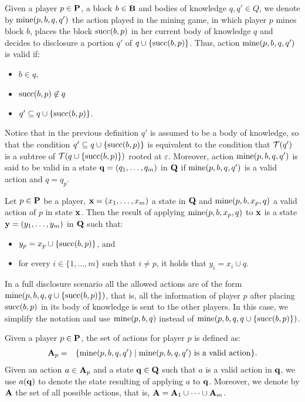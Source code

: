 \documentclass{article}
\begin{document}
Given a player $p \in \mathbf{P}$, a block $b \in \mathbf{B}$ and bodies of knowledge $q, q' \in Q$, we denote by $\text{mine}(p,b,q,q')$ the action played in the mining game, in which player $p$ mines block $b$, places the block $\text{succ}(b,p)$ in her current body of knowledge $q$ and decides to disclosure a portion $q'$ of $q \cup \{\text{succ}(b,p)\}$. Thus, action $\text{mine}(p,b,q,q')$ is valid if:
\begin{itemize}

\item $b \in q$,


\item $\text{succ}(b,p) \not\in q$

\item $q' \subseteq q \cup \{\text{succ}(b,p)\}$.
\end{itemize}
Notice that in the previous definition $q'$ is assumed to be a body of knowledge, so that the condition $q' \subseteq q \cup \{\text{succ}(b,p)\}$ is equivalent to the condition that $\mathcal{T}(q')$ is a subtree of $\mathcal{T}(q \cup \{\text{succ}(b,p)\})$ rooted at $\varepsilon$. Moreover, action $\text{mine}(p,b,q,q')$ is said to be valid in a state $\mathbf{q} = (q_1, \ldots, q_m)$ in $\mathbf{Q}$ if $\text{mine}(p,b,q,q')$ is a valid action and $q = q_p$.

Let $p \in \mathbf{P}$ be a player, $\mathbf{x} =  (x_1, \ldots, x_m)$ a state in $\mathbf{Q}$ and $\text{mine}(p,b,x_p,q)$ a valid action of $p$ in state $\mathbf{x}$. Then the result of applying $\text{mine}(p,b,x_p,q)$ to $\mathbf{x}$ is a state $\mathbf{y} = (y_1, \ldots, y_m)$ in $\mathbf{Q}$ such that:
\begin{itemize}
\item $y_p = x_p \cup \{\text{succ}(b,p)\}$, and

\item for every $i \in \{1, \ldots, m\}$ such that $i \neq p$, it holds that $y_i = x_i \cup q$.
\end{itemize}
In a full disclosure scenario all the allowed actions are of the form $\text{mine}(p,b,q,q \cup \{\text{succ}(b,p)\})$, that is, all the information of player $p$ after placing $\text{succ}(b,p)$ in its body of knowledge is sent to the other players. In this case, we simplify the notation and use $\text{mine}(p,b,q)$ instead of $\text{mine}(p,b,q,q\cup \{\text{succ}(b,p)\})$.

Given a player $p \in \mathbf{P}$, the set of actions for player $p$ is defined as:
\begin{eqnarray*}
\mathbf{A}_p & = & \{ \text{mine}(p,b,q,q') \mid \text{mine}(p,b,q,q') \text{ is a valid action}\}.
\end{eqnarray*}
Given an action $a \in \mathbf{A}_p$ and a state $\mathbf{q} \in \mathbf{Q}$ such that $a$ is a valid action in $\mathbf{q}$, we use $a(\mathbf{q})$ to denote the state resulting of applying $a$ to $\mathbf{q}$. Moreover, we denote by $\mathbf{A}$ the set of all possible actions, that is, $\mathbf{A} = \mathbf{A}_1 \cup \cdots \cup \mathbf{A}_m$.
\end{document}
